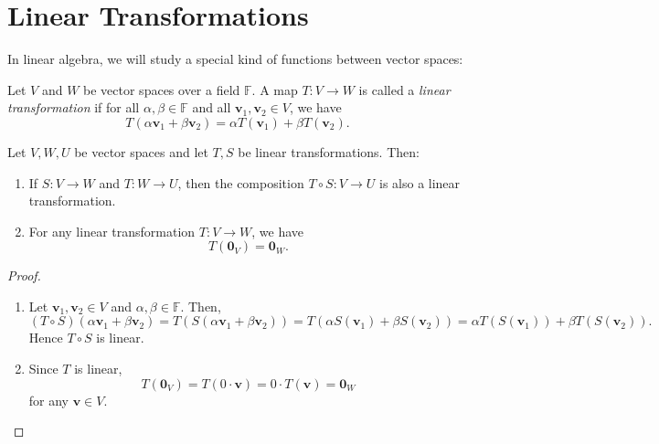 \chapter{Linear Transformations}
In linear algebra, we will study a special kind of functions between vector spaces:
\begin{definition}
Let \( V \) and \( W \) be vector spaces over a field \( \mathbb{F} \). A map \( T : V \to W \) is called a \emph{linear transformation} if for all \( \alpha, \beta \in \mathbb{F} \) and all \( \mathbf{v}_1, \mathbf{v}_2 \in V \), we have
\[
T(\alpha \mathbf{v}_1 + \beta \mathbf{v}_2) = \alpha T(\mathbf{v}_1) + \beta T(\mathbf{v}_2).
\]
\end{definition}

\begin{proposition}
Let \( V, W, U \) be vector spaces and let \( T, S \) be linear transformations. Then:
\begin{enumerate}
    \item If \( S : V \to W \) and \( T : W \to U \), then the composition \( T \circ S : V \to U \) is also a linear transformation.
    \item For any linear transformation \( T : V \to W \), we have
    \[
    T(\mathbf{0}_V) = \mathbf{0}_W.
    \]
\end{enumerate}
\end{proposition}
\begin{proof} \begin{enumerate}
    \item Let \( \mathbf{v}_1, \mathbf{v}_2 \in V \) and \( \alpha, \beta \in \mathbb{F} \). Then,
    \[
    (T \circ S)(\alpha \mathbf{v}_1 + \beta \mathbf{v}_2) = T(S(\alpha \mathbf{v}_1 + \beta \mathbf{v}_2)) = T(\alpha S(\mathbf{v}_1) + \beta S(\mathbf{v}_2)) = \alpha T(S(\mathbf{v}_1)) + \beta T(S(\mathbf{v}_2)).
    \]
    Hence \( T \circ S \) is linear.

    \item Since \( T \) is linear,
    \[
    T(\mathbf{0}_V) = T(0 \cdot \mathbf{v}) = 0 \cdot T(\mathbf{v}) = \mathbf{0}_W
    \]
    for any \( \mathbf{v} \in V \).
\end{enumerate}
\end{proof}

